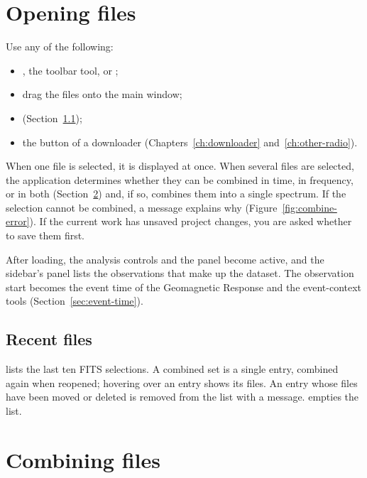 \section{Opening files}
\label{sec:opening-files}

Use any of the following:
\begin{itemize}
  \item {}, the  toolbar tool, or ;
  \item drag the files onto the main window;
  \item {} (Section~\ref{sec:recent-files});
  \item the  button of a downloader (Chapters~\ref{ch:downloader}
    and~\ref{ch:other-radio}).
\end{itemize}

When one file is selected, it is displayed at once. When several files are selected, the
application determines whether they can be combined in time, in frequency, or in both
(Section~\ref{sec:combine-rules}) and, if so, combines them into a single spectrum. If the
selection cannot be combined, a message explains why
(Figure~\ref{fig:combine-error}). If the current work has unsaved project changes, you are
asked whether to save them first.

After loading, the analysis controls and the  panel become active,
and the sidebar's  panel lists the observations that make up the dataset. The
observation start becomes the event time of the Geomagnetic Response and the event-context
tools (Section~\ref{sec:event-time}).

\subsection{Recent files}
\label{sec:recent-files}

 lists the last ten FITS selections. A combined set is a single
entry, combined again when reopened; hovering over an entry shows its files. An entry
whose files have been moved or deleted is removed from the list with a message.
 empties the list.

\section{Combining files}
\label{sec:combine-rules}

